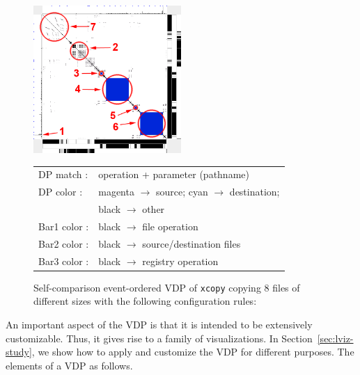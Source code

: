 \begin{figure}[htb]
\begin{center}
\includegraphics[width=0.5\textwidth]{lviz/cp-xcopy.png}
\caption{Self-comparison event-ordered VDP of {\tt xcopy}
copying 8 files of different sizes with the following configuration rules:
}
\begin{tabular}{ll}
DP match : & operation + parameter (pathname)\\
DP color : & magenta $\rightarrow$ source; cyan $\rightarrow$ destination;\\
 & black $\rightarrow$ other\\
Bar1 color : & black $\rightarrow$ file operation\\
Bar2 color : & black $\rightarrow$ source/destination files\\
Bar3 color : & black $\rightarrow$ registry operation
\end{tabular}
\label{fig:cp-xcopy}
\end{center}
\end{figure}

An important aspect of the VDP is that it is intended to
be extensively customizable. Thus, it gives rise to a family of visualizations.
In Section~\ref{sec:lviz-study}, we show how to apply and customize
the VDP for different purposes. The elements of a VDP as follows.

